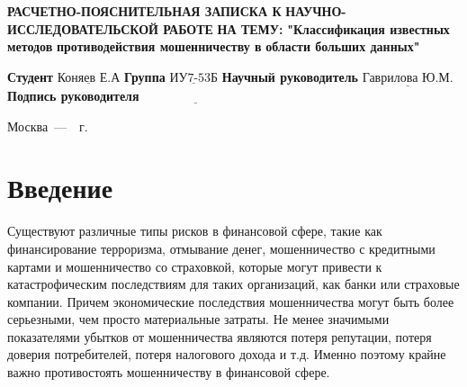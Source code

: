 \documentclass[12pt]{report}
\begin{document}
\begin{titlepage}
		
		\begin{center}
			\noindent\begin{minipage}{1.3\textwidth}\centering
				\Large\textbf{РАСЧЕТНО-ПОЯСНИТЕЛЬНАЯ ЗАПИСКА К}\newline
				\Large\textbf{НАУЧНО-ИССЛЕДОВАТЕЛЬСКОЙ РАБОТЕ}\newline
				\Large\textbf{НА ТЕМУ:}\newline
				\textbf{"Классификация известных методов}\newline
				\textbf{противодействия мошенничеству в}\newline
				\textbf{области больших данных"}\newline\newline
			\end{minipage}
		\end{center}
		
		\noindent\textbf{Студент} $\underline{\text{Коняев Е.А}}$\newline\newline
		\noindent\textbf{Группа} $\underline{\text{ИУ7-53Б}}$\newline\newline
		\noindent\textbf{Научный руководитель} $\underline{\text{Гаврилова Ю.М.}}$\newline\newline
		\noindent\textbf{Подпись руководителя}$\underline{\text{~~~~~~~~~~~~~~~~~~~~~~~~~~~}}$\newline\newline
		
		\begin{center}
			\vfill
			Москва~---~\the\year~г.
		\end{center}
	\end{titlepage}
	
	\setcounter{page}{2}
	\tableofcontents
	
	\newpage
	\chapter*{Введение}
	
	
	
	Существуют различные типы рисков в финансовой сфере, такие как финансирование терроризма, отмывание денег, мошенничество с кредитными картами и мошенничество со страховкой, которые могут 
	привести к катастрофическим последствиям для таких организаций, как банки или страховые компании. Причем экономические последствия мошенничества могут быть более серьезными, чем просто
материальные затраты. Не менее значимыми показателями убытков от мошенничества являются потеря репутации, потеря доверия потребителей, потеря налогового дохода и т.д. Именно поэтому крайне важно противостоять мошенничеству в финансовой сфере.
\end{document}
